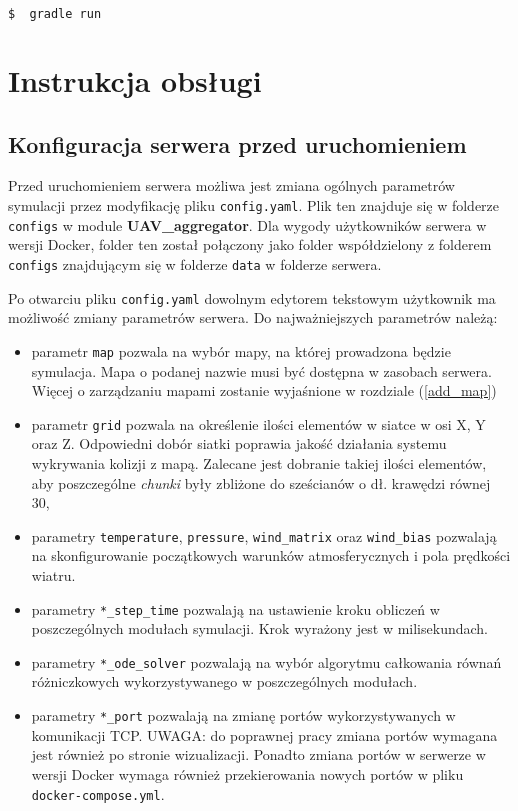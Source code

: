 \begin{lstlisting}[language=bash]
  $  gradle run 
\end{lstlisting}  

\newpage

\section{Instrukcja obsługi} \label{manual}

\subsection{Konfiguracja serwera przed uruchomieniem}

Przed uruchomieniem serwera możliwa jest zmiana ogólnych parametrów symulacji przez modyfikację pliku \texttt{config.yaml}. Plik ten znajduje się w folderze \texttt{configs} w module \textbf{UAV\_aggregator}. Dla wygody użytkowników serwera w wersji Docker, folder ten został połączony jako folder współdzielony z folderem \texttt{configs} znajdującym się w folderze \texttt{data} w folderze serwera.

Po otwarciu pliku \texttt{config.yaml} dowolnym edytorem tekstowym użytkownik ma możliwość zmiany parametrów serwera. Do najważniejszych parametrów należą:
 \begin{itemize}
\item parametr \texttt{map} pozwala na wybór mapy, na której prowadzona będzie symulacja. Mapa o podanej nazwie musi być dostępna w zasobach serwera. Więcej o zarządzaniu mapami zostanie wyjaśnione w rozdziale (\ref{add_map})
\item parametr \texttt{grid} pozwala na określenie ilości elementów w siatce w osi X, Y oraz Z. Odpowiedni dobór siatki poprawia jakość działania systemu wykrywania kolizji z mapą. Zalecane jest dobranie takiej ilości elementów, aby poszczególne \textit{chunki} były zbliżone do sześcianów o dł. krawędzi równej 30,
\item parametry \texttt{temperature}, \texttt{pressure}, \texttt{wind\_matrix} oraz \texttt{wind\_bias} pozwalają na skonfigurowanie początkowych warunków atmosferycznych i pola prędkości wiatru. 
\item parametry \texttt{*\_step\_time} pozwalają na ustawienie kroku obliczeń w poszczególnych modułach symulacji. Krok wyrażony jest w milisekundach.
\item parametry \texttt{*\_ode\_solver} pozwalają na wybór algorytmu całkowania równań różniczkowych wykorzystywanego w poszczególnych modułach.
\item parametry \texttt{*\_port} pozwalają na zmianę portów wykorzystywanych w komunikacji TCP. UWAGA: do poprawnej pracy zmiana portów wymagana jest również po stronie wizualizacji. Ponadto zmiana portów w serwerze w wersji Docker wymaga również przekierowania nowych portów w pliku \texttt{docker-compose.yml}.
\end{itemize}


